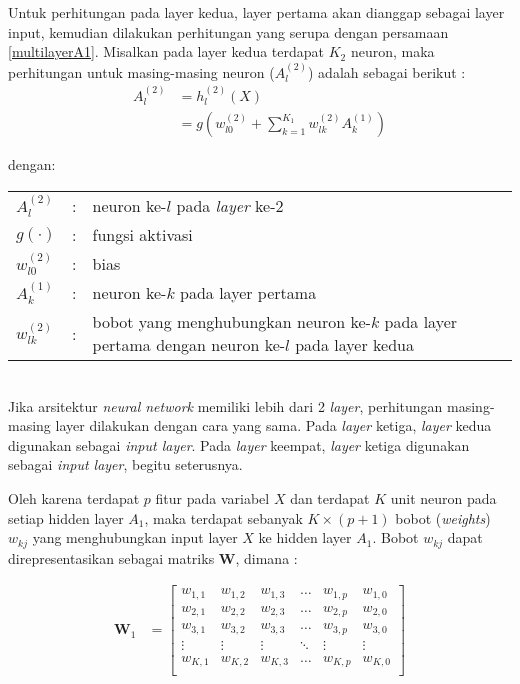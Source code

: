 \documentclass[a4paper,12pt]{report}
\begin{document}
Untuk perhitungan pada layer kedua, layer pertama akan dianggap sebagai layer input, kemudian dilakukan perhitungan yang serupa dengan persamaan \ref{multilayerA1}. Misalkan pada layer kedua terdapat $K_2$ neuron, maka perhitungan untuk masing-masing neuron ($A_l^{(2)}$) adalah sebagai berikut :
\begin{equation}
	\begin{split}
		A_l^{(2)} &= h_l^{(2)}(X) \\
		&= g\left(w_{l0}^{(2)} + \sum\limits_{k=1}^{K_1}w_{lk}^{(2)}A_{k}^{(1)}\right)
	\end{split}
	\label{multilayerA1}
\end{equation}

\noindent dengan: \\
\begin{tabular}{p{1cm} p{0.5cm} p{10cm}}
	$A_l^{(2)}$ &:& neuron ke-$l$ pada \textit{layer} ke-2 \\
	$g(\cdot)$ &:& fungsi aktivasi \\
	$w_{l0}^{(2)}$ &:& bias \\
	$A_k^{(1)}$ &:& neuron ke-$k$ pada layer pertama \\
	$w_{lk}^{(2)}$ &:& bobot yang menghubungkan neuron ke-$k$ pada layer pertama dengan neuron ke-$l$ pada layer kedua \\
\end{tabular} \\

Jika arsitektur \textit{neural network} memiliki lebih dari 2 \textit{layer}, perhitungan masing-masing layer dilakukan dengan cara yang sama. Pada \textit{layer} ketiga, \textit{layer} kedua digunakan sebagai \textit{input layer}. Pada \textit{layer} keempat, \textit{layer} ketiga digunakan sebagai \textit{input layer}, begitu seterusnya. 

Oleh karena terdapat $p$ fitur pada variabel $X$ dan terdapat $K$ unit neuron pada setiap hidden layer $A_1$, maka terdapat sebanyak $K \times (p+1)$ bobot (\textit{weights}) $w_{kj}$ yang menghubungkan input layer $X$ ke hidden layer $A_1$. Bobot $w_{kj}$ dapat direpresentasikan sebagai matriks $\mathbf{W}$, dimana :

\begin{equation}
	\begin{split}
		\mathbf{W}_1 &=  
		\begin{bmatrix}
			w_{1, 1} & w_{1, 2} & w_{1, 3} & \dots & w_{1, p} & w_{1, 0} \\
			w_{2, 1} & w_{2, 2} & w_{2, 3} & \dots & w_{2, p} & w_{2, 0} \\
			w_{3, 1} & w_{3, 2} & w_{3, 3} & \dots & w_{3, p} & w_{3, 0} \\
			\vdots & \vdots & \vdots & \ddots & \vdots & \vdots \\
			w_{K, 1} & w_{K, 2} & w_{K, 3} & \dots & w_{K, p} & w_{K, 0}\\
		\end{bmatrix} \\
	\end{split}
	\label{matriksW}
\end{equation}
\end{document}
